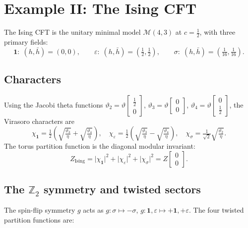 \documentclass[11pt,a4paper]{article}
\theoremstyle{plain}
\theoremstyle{definition}
\theoremstyle{remark}
\newcommand{\Ztwo}{\mathbb{Z}_2}
\newcommand{\partfn}[2]{Z\!\begin{bmatrix}#1\\#2\end{bmatrix}}
\newcommand{\abs}[1]{\lvert #1 \rvert}
\begin{document}
\section{Example II: The Ising CFT}

The Ising CFT is the unitary minimal model $\mathcal{M}(4,3)$ at
$c = \frac{1}{2}$, with three primary fields:
\[
  \mathbf{1}:\;(h,\bar{h})=(0,0),\qquad
  \varepsilon:\;(h,\bar{h})=(\tfrac{1}{2},\tfrac{1}{2}),\qquad
  \sigma:\;(h,\bar{h})=(\tfrac{1}{16},\tfrac{1}{16}).
\]

\subsection{Characters}

Using the Jacobi theta functions
$\vartheta_2 = \vartheta\!\begin{bmatrix}\frac{1}{2}\\0\end{bmatrix}$,
$\vartheta_3 = \vartheta\!\begin{bmatrix}0\\0\end{bmatrix}$,
$\vartheta_4 = \vartheta\!\begin{bmatrix}0\\\frac{1}{2}\end{bmatrix}$,
the Virasoro characters are
\[
  \chi_{\mathbf{1}} = \tfrac{1}{2}\!\left(\sqrt{\tfrac{\vartheta_3}{\eta}}
    +\sqrt{\tfrac{\vartheta_4}{\eta}}\right),\quad
  \chi_{\varepsilon} = \tfrac{1}{2}\!\left(\sqrt{\tfrac{\vartheta_3}{\eta}}
    -\sqrt{\tfrac{\vartheta_4}{\eta}}\right),\quad
  \chi_{\sigma} = \tfrac{1}{\sqrt{2}}\sqrt{\tfrac{\vartheta_2}{\eta}}.
\]
The torus partition function is the diagonal modular invariant:
\begin{equation}\label{eq:ZIsing}
  Z_{\mathrm{Ising}}
  = \abs{\chi_{\mathbf{1}}}^2 + \abs{\chi_\varepsilon}^2 + \abs{\chi_\sigma}^2
  = \partfn{0}{0}.
\end{equation}

\subsection{The $\Ztwo$ symmetry and twisted sectors}

The spin-flip symmetry $g$ acts as
$g: \sigma \mapsto -\sigma$, $g: \mathbf{1},\varepsilon \mapsto
+\mathbf{1},+\varepsilon$.
The four twisted partition functions are:
\end{document}
